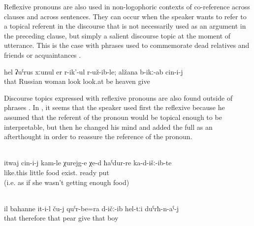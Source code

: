 Reflexive pronouns are also used in non-logophoric contexts of co-reference across clauses and across sentences. They can occur when the speaker wants to refer to a topical referent in the discourse that is not necessarily used as an argument in the preceding clause, but simply a salient discourse topic at the moment of utterance. This is the case with  phrases used to commemorate dead relatives and friends or acquaintances .

\begin{exe}
	\ex	\label{ex:It turned out that the Russian woman had looked}
	\gll	hel	ʡuˁrus	xːunul	er	r-ik'-ul	r-už-ib-le;	alžana	b-ikː-ab	cin-i-j\\
		that	Russian	woman	look	look.at	be	heaven	give	\\
	\glt	{} 
\end{exe}

Discourse topics expressed with reflexive pronouns are also found outside of  phrases . In , it seems that the speaker used first the reflexive because he assumed that the referent of the pronoun would be topical enough to be interpretable, but then he changed his mind and added the full  as an afterthought in order to reassure the reference of the pronoun.

\begin{exe}
	\\	\label{ex:‎Like this there is a little food prepared and served for her}
	\gll	itwaj	cin-i-j	kam-le	χurejg-e	χe-d	ħaˁdur-re	ka-d-išː-ib-te\\
		like.this		little	food	exist.	ready	put\\
	\glt	{} (i.e. as if she wasn't getting enough food)

	\\	\label{ex:therefore he gave them pears, to the boys}
	\gll	il	bahanne	it-i-l	ču-j	quˁr-be=ra	d-ičː-ib	hel-tːi	duˁrħ-n-aˁ-j\\
		that	therefore	that		pear	give	that	boy\\
	\glt	{}
\end{exe}

